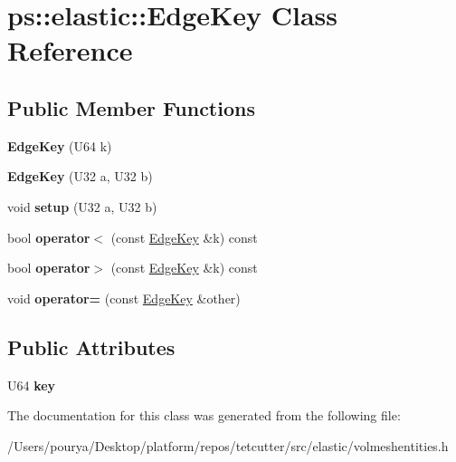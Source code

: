 \hypertarget{classps_1_1elastic_1_1EdgeKey}{}\section{ps\+:\+:elastic\+:\+:Edge\+Key Class Reference}
\label{classps_1_1elastic_1_1EdgeKey}
\subsection*{Public Member Functions}
\begin{DoxyCompactItemize}
\item 
\hypertarget{classps_1_1elastic_1_1EdgeKey_aa306aadbf06a81494997ad2c846c20bd}{}{\bfseries Edge\+Key} (U64 k)\label{classps_1_1elastic_1_1EdgeKey_aa306aadbf06a81494997ad2c846c20bd}

\item 
\hypertarget{classps_1_1elastic_1_1EdgeKey_a5d7a226868ee9637f6c54d68508a5e14}{}{\bfseries Edge\+Key} (U32 a, U32 b)\label{classps_1_1elastic_1_1EdgeKey_a5d7a226868ee9637f6c54d68508a5e14}

\item 
\hypertarget{classps_1_1elastic_1_1EdgeKey_af900469a871dba24107eda8188e3cb85}{}void {\bfseries setup} (U32 a, U32 b)\label{classps_1_1elastic_1_1EdgeKey_af900469a871dba24107eda8188e3cb85}

\item 
\hypertarget{classps_1_1elastic_1_1EdgeKey_af29e66108acfd35c32616d429d80841d}{}bool {\bfseries operator$<$} (const \hyperlink{classps_1_1elastic_1_1EdgeKey}{Edge\+Key} \&k) const \label{classps_1_1elastic_1_1EdgeKey_af29e66108acfd35c32616d429d80841d}

\item 
\hypertarget{classps_1_1elastic_1_1EdgeKey_a7692060e4041ec2eed78cbd5e3574dcf}{}bool {\bfseries operator$>$} (const \hyperlink{classps_1_1elastic_1_1EdgeKey}{Edge\+Key} \&k) const \label{classps_1_1elastic_1_1EdgeKey_a7692060e4041ec2eed78cbd5e3574dcf}

\item 
\hypertarget{classps_1_1elastic_1_1EdgeKey_aa7d2dd8d6c3363fa73c969e22dfc68b0}{}void {\bfseries operator=} (const \hyperlink{classps_1_1elastic_1_1EdgeKey}{Edge\+Key} \&other)\label{classps_1_1elastic_1_1EdgeKey_aa7d2dd8d6c3363fa73c969e22dfc68b0}

\end{DoxyCompactItemize}
\subsection*{Public Attributes}
\begin{DoxyCompactItemize}
\item 
\hypertarget{classps_1_1elastic_1_1EdgeKey_a240ecee3a3243bb9b227119169865cb9}{}U64 {\bfseries key}\label{classps_1_1elastic_1_1EdgeKey_a240ecee3a3243bb9b227119169865cb9}

\end{DoxyCompactItemize}


The documentation for this class was generated from the following file\+:\begin{DoxyCompactItemize}
\item 
/\+Users/pourya/\+Desktop/platform/repos/tetcutter/src/elastic/volmeshentities.\+h\end{DoxyCompactItemize}
